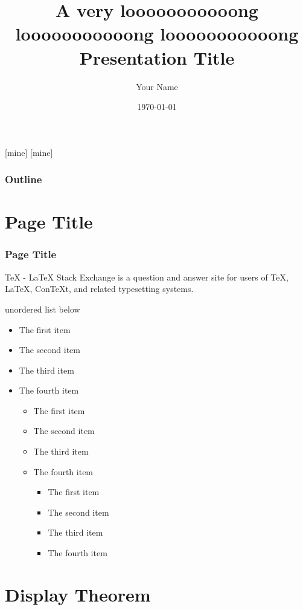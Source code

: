 \documentclass[10pt]{beamer}
\author{Your Name}
\title{A very looooooooooong  looooooooooong  looooooooooong Presentation Title}
\institute{xxx University}
\date{\today}
\begin{document}
[mine]
[mine]

\frame[plain]{\titlepage}

\begin{frame}
\frametitle{Outline}
\tableofcontents
\end{frame}

\section{Page Title}

\begin{frame}
\sectionpage
\end{frame}

\begin{frame}
\frametitle{Page Title}

TeX - LaTeX Stack Exchange is a question and answer site for users of TeX, LaTeX, ConTeXt, and related typesetting systems.

\vspace{0.4cm}

unordered list below

\begin{itemize}
\item The first item
\item The second item
\item The third item
\item The fourth item
\begin{itemize}
\item The first item
\item The second item
\item The third item
\item The fourth item
\begin{itemize}
\item The first item
\item The second item
\item The third item
\item The fourth item
\end{itemize}
\end{itemize}
\end{itemize}

\end{frame}

\section{Display Theorem}
\end{document}
